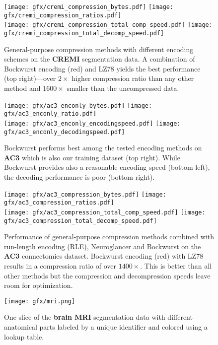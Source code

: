 \begin{figure}[h]
\texttt{[image: gfx/cremi\_compression\_bytes.pdf]}%
\texttt{[image: gfx/cremi\_compression\_ratios.pdf]}%
\\
\texttt{[image: gfx/cremi\_compression\_total\_comp\_speed.pdf]}%
\texttt{[image: gfx/cremi\_compression\_total\_decomp\_speed.pdf]}%
\caption{General-purpose compression methods with different encoding schemes on the \textbf{CREMI} segmentation data. A combination of Bockwurst encoding (red) and LZ78 yields the best performance (top right)---over $2\times$ higher compression ratio than any other method and $1600\times$ smaller than the uncompressed data.}
\label{fig:cremi_compression_results}
\end{figure}

%
%
%
\begin{figure}[h]
\texttt{[image: gfx/ac3\_enconly\_bytes.pdf]}%
\texttt{[image: gfx/ac3\_enconly\_ratio.pdf]}%
\\
\texttt{[image: gfx/ac3\_enconly\_encodingspeed.pdf]}%
\texttt{[image: gfx/ac3\_enconly\_decodingspeed.pdf]}%
\caption{Bockwurst performs best among the tested encoding methods on \textbf{AC3} which is also our training dataset (top right). While Bockwurst provides also a reasonable encoding speed (bottom left), the decoding performance is poor (bottom right).}
\label{fig:ac3_encoding_results}
\end{figure}


\begin{figure}[h]
\texttt{[image: gfx/ac3\_compression\_bytes.pdf]}%
\texttt{[image: gfx/ac3\_compression\_ratios.pdf]}%
\\
\texttt{[image: gfx/ac3\_compression\_total\_comp\_speed.pdf]}%
\texttt{[image: gfx/ac3\_compression\_total\_decomp\_speed.pdf]}%
\caption{Performance of general-purpose compression methods combined with run-length encoding (RLE), Neuroglancer and Bockwurst on the \textbf{AC3} connectomics dataset. Bockwurst encoding (red) with LZ78 results in a compression ratio of over $1400\times$. This is better than all other methods but the compression and decompression speeds leave room for optimization.}
\label{fig:ac3_compression_results}
\end{figure}


\begin{figure}[h]
\center
\texttt{[image: gfx/mri.png]}%
\caption{One slice of the \textbf{brain MRI} segmentation data with different anatomical parts labeled by a unique identifier and colored using a lookup table.}
\label{fig:mridata}
\end{figure}

